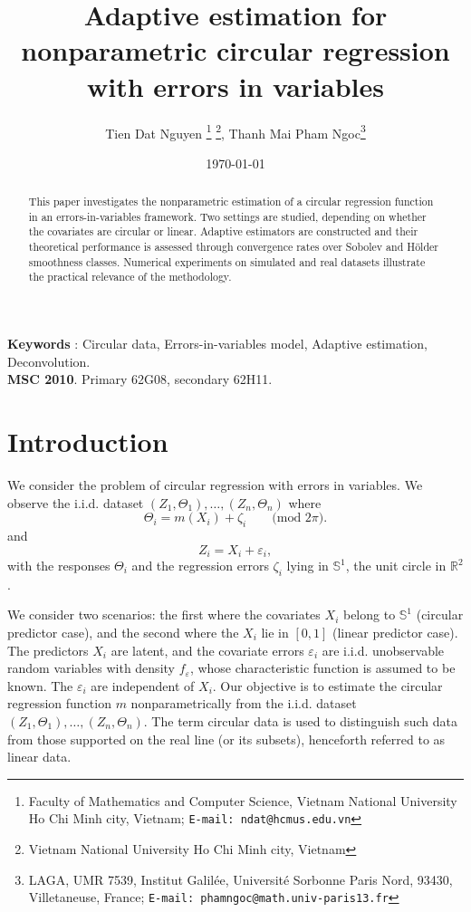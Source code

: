 \documentclass[11pt,a4paper,openany]{article}
\author{Tien Dat Nguyen \thanks{Faculty of Mathematics and Computer Science, Vietnam National University Ho Chi Minh city, Vietnam; \texttt{E-mail: ndat@hcmus.edu.vn}}
\thanks{Vietnam National University Ho Chi Minh city, Vietnam},
Thanh Mai Pham Ngoc\thanks{LAGA, UMR 7539, Institut Galil\'ee, Universit\'e Sorbonne Paris Nord, 93430,
Villetaneuse, France; \texttt{E-mail: phamngoc@math.univ-paris13.fr}}}
\title{Adaptive  estimation for nonparametric circular regression with errors in variables}
\date{\today}
\begin{document}
\maketitle

\begin{abstract}
This paper investigates the nonparametric estimation of a circular regression function in an errors-in-variables framework. Two settings are studied, depending on whether the covariates are circular or linear. Adaptive estimators are constructed and their theoretical performance is assessed through convergence rates over Sobolev and H\"older smoothness classes. Numerical experiments on simulated and real datasets illustrate the practical relevance of the methodology.
\end{abstract}


\noindent \textbf{Keywords} : Circular data, Errors-in-variables model, Adaptive estimation,  Deconvolution. \\%
\textbf{MSC 2010}. Primary 62G08, secondary 62H11.

\section{Introduction}



We consider the problem of circular regression with errors in variables. We observe the i.i.d. dataset $(Z_1, \Theta_1), \dots, (Z_n,\Theta_n)  $ where
$$
\Theta_i = m(X_i) + \zeta_i \quad  \quad  \textrm{(mod $2\pi$)}.
$$
 and 
$$
Z_i = X_i + \varepsilon_i,
$$
with the responses $\Theta_i$ and the regression errors $\zeta_i$ lying in $\mathbb{S}^1$, the unit circle in $\mathbb{R}^2$.


We consider two scenarios: the first where the covariates $X_i$ belong to $\mathbb{S}^1$ (circular predictor case), and the second where the $X_i$ lie in $[0,1]$ (linear predictor case). The predictors $X_i$ are latent, and the covariate errors $\varepsilon_i$ are i.i.d. unobservable random variables with density $f_\varepsilon$, whose characteristic function is assumed to be known. %
The $\varepsilon_i$ are independent of $X_i$. Our objective is to estimate the circular regression function $m$ nonparametrically from the i.i.d. dataset $(Z_1, \Theta_1), \dots, (Z_n,\Theta_n)$. The term circular data is used to distinguish such data from those supported on the real line (or its subsets), henceforth referred to as linear data.
\end{document}
